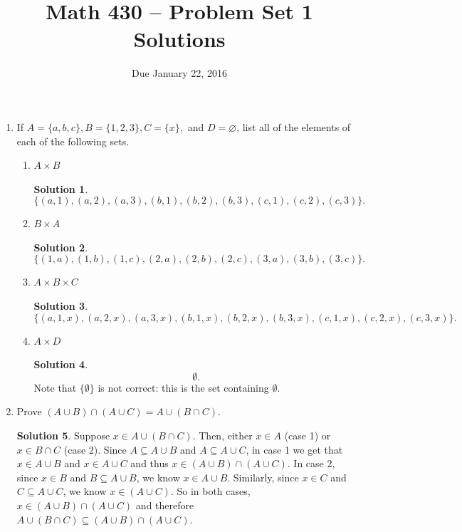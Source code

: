 \documentclass{article}
\title{Math 430 -- Problem Set 1 Solutions}
\date{Due January 22, 2016}
\theoremstyle{definition}
\newtheorem*{solution}{Solution}
\begin{document}
\maketitle

\begin{enumerate}
\item[1.2.] If $A = \{a,b,c\}, B = \{1,2,3\}, C = \{x\},$ and $D = \varnothing$, list all of the elements of each of the following sets.
\begin{enumerate}
\item $A \times B$
\begin{solution}
$$\{(a,1),(a,2),(a,3),(b,1),(b,2),(b,3),(c,1),(c,2),(c,3)\}.$$
\end{solution}
\item $B \times A$
\begin{solution}
$$\{(1,a),(1,b),(1,c),(2,a),(2,b),(2,c),(3,a),(3,b),(3,c)\}.$$
\end{solution}
\item $A \times B \times C$
\begin{solution}
$$\{(a,1,x),(a,2,x),(a,3,x),(b,1,x),(b,2,x),(b,3,x),(c,1,x),(c,2,x),(c,3,x)\}.$$
\end{solution}
\item $A \times D$
\begin{solution}
$$\emptyset.$$
Note that $\{\emptyset\}$ is not correct: this is the set containing $\emptyset$.
\end{solution}
\end{enumerate}
\item[1.6.] Prove $(A \cup B) \cap (A \cup C) = A \cup (B \cap C)$.
\begin{solution}
Suppose $x \in A \cup (B \cap C)$.  Then, either $x \in A$ (case 1) or $x \in B \cap C$ (case 2).  Since $A \subseteq A \cup B$ and $A \subseteq A \cup C$, in case 1 we get that $x \in A \cup B$ and $x \in A \cup C$ and thus $x \in (A \cup B) \cap (A \cup C)$.  In case 2, since $x \in B$ and $B \subseteq A \cup B$, we know $x \in A \cup B$.  Similarly, since $x \in C$ and $C \subseteq A \cup C$, we know $x \in (A \cup C)$.  So in both cases, $x \in (A \cup B) \cap (A \cup C)$ and therefore $A \cup (B \cap C) \subseteq (A \cup B) \cap (A \cup C)$.


\end{solution}
\end{enumerate}
\end{document}
